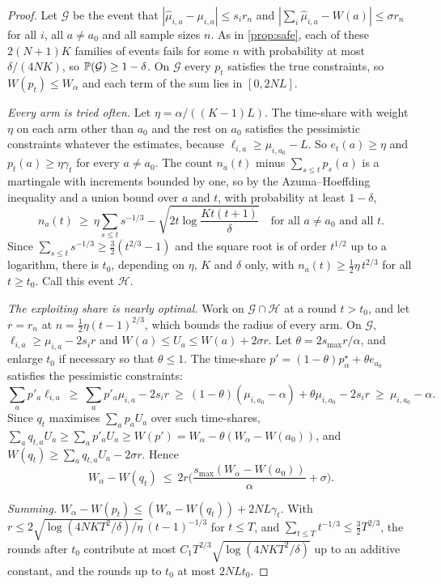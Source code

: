 \begin{proof}
Let $\mathcal G$ be the event that $|\hat\mu_{i,a}-\mu_{i,a}|\le s_ir_n$ and $|\sum_i\hat\mu_{i,a}-W(a)|\le\sigma r_n$ for all $i$, all $a\neq a_0$ and all sample sizes $n$. As in \cref{prop:safe}, each of these $2(N+1)K$ families of events fails for some $n$ with probability at most $\delta/(4NK)$, so $\mathbb{P}(\mathcal G)\ge1-\delta$. On $\mathcal G$ every $p_t$ satisfies the true constraints, so $W(p_t)\le W_\alpha$ and each term of the sum lies in $[0,2NL]$.

\emph{Every arm is tried often.} Let $\eta=\alpha/((K-1)L)$. The time-share with weight $\eta$ on each arm other than $a_0$ and the rest on $a_0$ satisfies the pessimistic constraints whatever the estimates, because $\ell_{i,a}\ge\mu_{i,a_0}-L$. So $e_t(a)\ge\eta$ and $p_t(a)\ge\eta\gamma_t$ for every $a\neq a_0$. The count $n_a(t)$ minus $\sum_{s\le t}p_s(a)$ is a martingale with increments bounded by one, so by the Azuma--Hoeffding inequality and a union bound over $a$ and $t$, with probability at least $1-\delta$,
\[
  n_a(t)\ \ge\ \eta\sum_{s\le t}s^{-1/3}-\sqrt{2t\log\frac{Kt(t+1)}{\delta}}\quad\text{for all } a\neq a_0 \text{ and all } t.
\]
Since $\sum_{s\le t}s^{-1/3}\ge\tfrac32(t^{2/3}-1)$ and the square root is of order $t^{1/2}$ up to a logarithm, there is $t_0$, depending on $\eta$, $K$ and $\delta$ only, with $n_a(t)\ge\tfrac12\eta\,t^{2/3}$ for all $t\ge t_0$. Call this event $\mathcal H$.

\emph{The exploiting share is nearly optimal.} Work on $\mathcal G\cap\mathcal H$ at a round $t>t_0$, and let $r=r_n$ at $n=\tfrac12\eta(t-1)^{2/3}$, which bounds the radius of every arm. On $\mathcal G$, $\ell_{i,a}\ge\mu_{i,a}-2s_ir$ and $W(a)\le U_a\le W(a)+2\sigma r$. Let $\theta=2s_{\max}r/\alpha$, and enlarge $t_0$ if necessary so that $\theta\le1$. The time-share $p'=(1-\theta)p^\star_\alpha+\theta e_{a_0}$ satisfies the pessimistic constraints:
\[
  \textstyle\sum_ap'_a\ell_{i,a}\ \ge\ \sum_ap'_a\mu_{i,a}-2s_ir\ \ge\ (1-\theta)(\mu_{i,a_0}-\alpha)+\theta\mu_{i,a_0}-2s_ir\ \ge\ \mu_{i,a_0}-\alpha .
\]
Since $q_t$ maximises $\sum_ap_aU_a$ over such time-shares, $\sum_aq_{t,a}U_a\ge\sum_ap'_aU_a\ge W(p')=W_\alpha-\theta(W_\alpha-W(a_0))$, and $W(q_t)\ge\sum_aq_{t,a}U_a-2\sigma r$. Hence
\[
  W_\alpha-W(q_t)\ \le\ 2r\Big(\frac{s_{\max}(W_\alpha-W(a_0))}{\alpha}+\sigma\Big).
\]

\emph{Summing.} $W_\alpha-W(p_t)\le(W_\alpha-W(q_t))+2NL\gamma_t$. With $r\le2\sqrt{\log(4NKT^2/\delta)/\eta}\,(t-1)^{-1/3}$ for $t\le T$, and $\sum_{t\le T}t^{-1/3}\le\tfrac32T^{2/3}$, the rounds after $t_0$ contribute at most $C_1T^{2/3}\sqrt{\log(4NKT^2/\delta)}$ up to an additive constant, and the rounds up to $t_0$ at most $2NLt_0$.
\end{proof}

